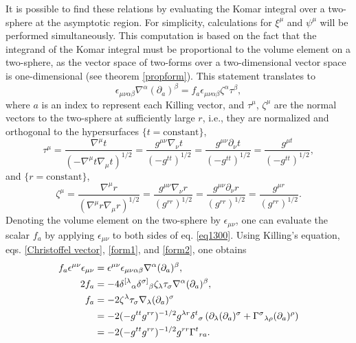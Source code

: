 \documentclass[
12pt,		%
openright,	%
twoside,  %
a4paper,			%
chapter=TITLE,		%
english,			%
french,				%
spanish,			%
brazil				%
]{USPSC-classe/USPSC}
\begin{document}
It is possible to find these relations by evaluating the Komar integral over a two-sphere at the asymptotic region. For simplicity, calculations for $\xi^{\mu}$ and $\psi^{\mu}$ will be performed simultaneously. This computation is based on the fact that the integrand of the Komar integral must be proportional to the volume element on a two-sphere, as the vector space of two-forms over a two-dimensional vector space is one-dimensional (see theorem \ref{propform}). This statement translates to
\begin{equation}\label{eq1300}
    \epsilon_{\mu\nu\alpha\beta}\nabla^{\alpha}(\partial_a)^{\beta}=f_a\epsilon_{\mu\nu\alpha\beta}\zeta^{\alpha}\tau^{\beta},
\end{equation}
where $a$ is an index to represent each Killing vector, and $\tau^{\mu}$, $\zeta^{\mu}$ are the normal vectors to the two-sphere at sufficiently large $r$, i.e., they are normalized and orthogonal to the hypersurfaces $\{t=\text{constant}\}$,
\begin{equation}\label{normalt}
    \tau^{\mu}=\frac{\nabla^{\mu}t}{\left(-\nabla^{\mu}t\nabla_{\mu}t\right)^{1/2}}=\frac{g^{\mu\nu}\nabla_{\nu}t}{\left(-g^{tt}\right)^{1/2}}=\frac{g^{\mu\nu}\partial_{\nu}t}{\left(-g^{tt}\right)^{1/2}}=\frac{g^{\mu t}}{\left(-g^{tt}\right)^{1/2}},
\end{equation}
and $\{r=\text{constant}\}$,
\begin{equation}\label{normalr}
    \zeta^{\mu}=\frac{\nabla^{\mu}r}{\left(\nabla^{\mu}r\nabla_{\mu}r\right)^{1/2}}=\frac{g^{\mu\nu}\nabla_{\nu}r}{\left(g^{rr}\right)^{1/2}}=\frac{g^{\mu\nu}\partial_{\nu}r}{\left(g^{rr}\right)^{1/2}}=\frac{g^{\mu r}}{\left(g^{rr}\right)^{1/2}}.
\end{equation}
Denoting the volume element on the two-sphere by $\epsilon_{\mu\nu}$, one can evaluate the scalar $f_{a}$ by applying $\epsilon_{\mu\nu}$ to both sides of eq. \ref{eq1300}. Using Killing's equation, eqs. \ref{Christoffel vector}, \ref{form1}, and \ref{form2}, one obtains
\begin{equation}
\begin{aligned}[b]
f_a\epsilon^{\mu\nu}\epsilon_{\mu\nu}&=\epsilon^{\mu\nu}\epsilon_{\mu\nu\alpha\beta}\nabla^{\alpha}(\partial_a)^{\beta},\\
 2f_a&=-4\delta^{[{\lambda}}\mathstrut_{\alpha}\delta^{\sigma]}\mathstrut_{\beta}\zeta_{\lambda}\tau_{\sigma}\nabla^{\alpha}(\partial_a)^{\beta},\\
f_a&=-2\zeta^{\lambda}\tau_{\sigma}\nabla_{{\lambda}}(\partial_a)^{\sigma}\\
&=-2(-g^{tt}g^{rr})^{-1/2}g^{\lambda r}\delta^{t}\mathstrut_{\sigma}\left(\partial_{\lambda}(\partial_a)^{\sigma}+\Gamma^{\sigma}\mathstrut_{\lambda \rho}(\partial_a)^{\rho}\right)\\
&=-2(-g^{tt}g^{rr})^{-1/2}g^{rr}\Gamma^{t}\mathstrut_{r a}.
\end{aligned}    
\end{equation}
\end{document}
